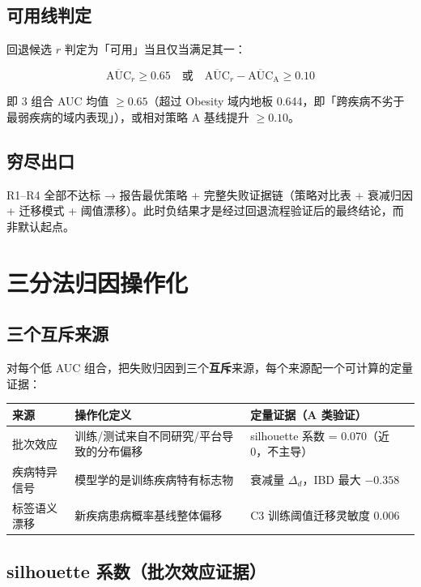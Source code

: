 \documentclass{internal-report}
\begin{document}
\subsection{可用线判定}

回退候选 $r$ 判定为「可用」当且仅当满足其一：

$$
\overline{\text{AUC}}_r \ge 0.65 \quad \text{或} \quad \overline{\text{AUC}}_r - \overline{\text{AUC}}_{\text{A}} \ge 0.10
$$

即 3 组合 AUC 均值 $\ge 0.65$（超过 Obesity 域内地板 0.644，即「跨疾病不劣于最弱疾病的域内表现」），或相对策略 A 基线提升 $\ge 0.10$。

\subsection{穷尽出口}

R1--R4 全部不达标 → 报告最优策略 + 完整失败证据链（策略对比表 + 衰减归因 + 迁移模式 + 阈值漂移）。此时负结果才是经过回退流程验证后的最终结论，而非默认起点。

\section{三分法归因操作化}

\subsection{三个互斥来源}

对每个低 AUC 组合，把失败归因到三个\textbf{互斥}来源，每个来源配一个可计算的定量证据：

\begin{center}
\begin{tabular}{lp{}p{}}
\toprule
来源 & 操作化定义 & 定量证据（A 类验证） \\
\midrule
批次效应 & 训练/测试来自不同研究/平台导致的分布偏移 & silhouette 系数 = 0.070（近 0，不主导） \\
疾病特异信号 & 模型学的是训练疾病特有标志物 & 衰减量 $\Delta_d$，IBD 最大 $-0.358$ \\
标签语义漂移 & 新疾病患病概率基线整体偏移 & C3 训练阈值迁移灵敏度 0.006 \\
\bottomrule
\end{tabular}
\end{center}

\subsection{silhouette 系数（批次效应证据）}
\end{document}
